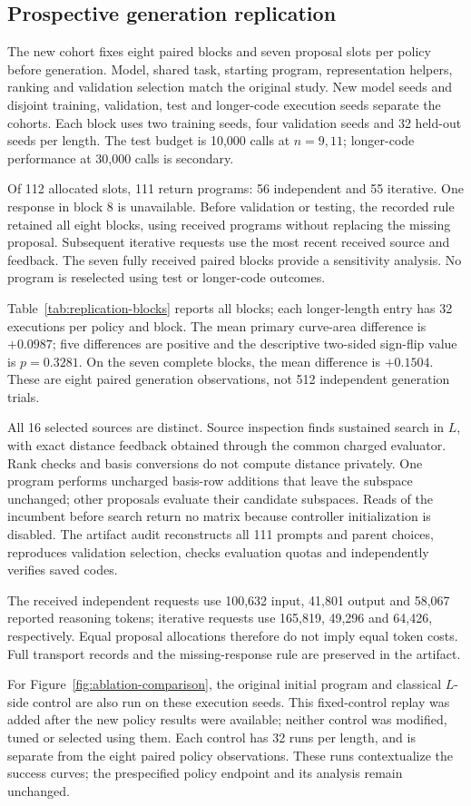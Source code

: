 \subsection{Prospective generation replication}\label{app:replication}
The new cohort fixes eight paired blocks and seven proposal slots per
policy before generation. Model, shared task, starting program,
representation helpers, ranking and validation selection match the
original study. New model seeds and disjoint training, validation,
test and longer-code execution seeds separate the cohorts. Each block
uses two training seeds, four validation seeds and 32 held-out seeds
per length. The test budget is 10,000 calls at $n=9,11$; longer-code
performance at 30,000 calls is secondary.

Of 112 allocated slots, 111 return programs: 56 independent and 55
iterative. One response in block 8 is unavailable. Before validation
or testing, the recorded rule retained all eight blocks, using received
programs without replacing the missing proposal. Subsequent iterative
requests use the most recent received source and feedback. The seven
fully received paired blocks provide a sensitivity analysis. No
program is reselected using test or longer-code outcomes.

Table~\ref{tab:replication-blocks} reports all blocks; each longer-length
entry has 32 executions per policy and block. The mean primary
curve-area difference is $+0.0987$; five differences are positive and
the descriptive two-sided sign-flip value is $p=0.3281$. On the seven
complete blocks, the mean difference is $+0.1504$. These are eight
paired generation observations, not 512 independent generation trials.



All 16 selected sources are distinct. Source inspection finds sustained
search in $L$, with exact distance feedback obtained through the common
charged evaluator. Rank checks and basis conversions do not compute
distance privately. One program performs uncharged basis-row additions
that leave the subspace unchanged; other proposals evaluate their
candidate subspaces. Reads of the incumbent before search return no
matrix because controller initialization is disabled. The artifact audit
reconstructs all 111 prompts and parent choices, reproduces validation
selection, checks evaluation quotas and independently verifies saved codes.

The received independent requests use 100,632 input, 41,801 output and
58,067 reported reasoning tokens; iterative requests use 165,819,
49,296 and 64,426, respectively. Equal proposal allocations therefore
do not imply equal token costs. Full transport records and the
missing-response rule are preserved in the artifact.

For Figure~\ref{fig:ablation-comparison}, the original initial program
and classical $L$-side control are also run on these execution seeds.
This fixed-control replay was added after the new policy results were
available; neither control was modified, tuned or selected using them.
Each control has 32 runs per length, and is separate from the eight
paired policy observations. These runs contextualize the success curves;
the prespecified policy endpoint and its analysis remain unchanged.
